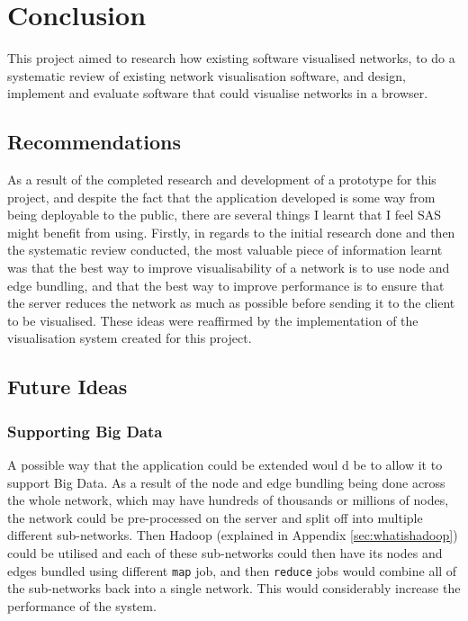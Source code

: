 \documentclass[../dissertation.tex]{subfiles}
\begin{document}
\chapter{Conclusion}

This project aimed to research how existing software visualised networks, to do a systematic review of existing network visualisation software, and design, implement and evaluate software that could visualise networks in a browser. 

\section{Recommendations}

As a result of the completed research and development of a prototype for this project, and despite the fact that the application developed is some way from being deployable to the public, there are several things I learnt that I feel SAS might benefit from using. Firstly, in regards to the initial research done and then the systematic review conducted, the most valuable piece of information learnt was that the best way to improve visualisability of a network is to use node and edge bundling, and that the best way to improve performance is to ensure that the server reduces the network as much as possible before sending it to the client to be visualised. These ideas were reaffirmed by the implementation of the visualisation system created for this project.

\section{Future Ideas}
\label{sec:further_ideas}

\subsection{Supporting Big Data}

A possible way that the application could be extended woul
d be to allow it to support Big Data. As a result of the node and edge bundling being done across the whole network, which may have hundreds of thousands or millions of nodes, the network could be pre-processed on the server and split off into multiple different sub-networks. Then Hadoop \cite{hadoop} (explained in Appendix \ref{sec:whatishadoop}) could be utilised and each of these sub-networks could then have its nodes and edges bundled using different \texttt{map} job, and then \texttt{reduce} jobs would combine all of the sub-networks back into a single network. This would considerably increase the performance of the system.
\end{document}
